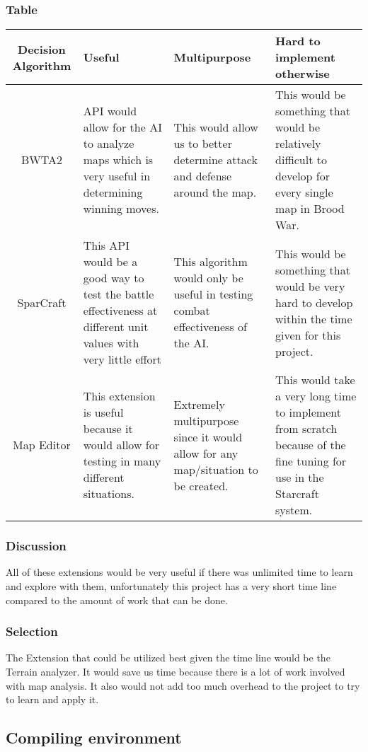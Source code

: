\documentclass[10pt,letterpaper,onecolumn,draftclsnofoot]{IEEEtran}
\begin{document}
\subsubsection{Table}
\begin{center}
	\begin{tabular}{ ||C|M|M|M|| } 
		\hline
		Decision Algorithm & Useful & Multipurpose & Hard to implement otherwise \\
		\hline
		BWTA2 & API would allow for the AI to analyze maps which is very useful in determining winning moves. & This would allow us to better determine attack and defense around the map. & This would be something that would be relatively difficult to develop for every single map in Brood War. \\ 
		\hline
		SparCraft & This API would be a good way to test the battle effectiveness at different unit values with very little effort & This algorithm would only be useful in testing combat effectiveness of the AI. & This would be something that would be very hard to develop within the time given for this project. \\ 
		\hline
		Map Editor & This extension is useful because it would allow for testing in many different situations. & Extremely multipurpose since it would allow for any map/situation to be created. & This would take a very long time to implement from scratch because of the fine tuning for use in the Starcraft system. \\ 
		\hline
	\end{tabular}
\end{center}
\subsubsection{Discussion}
All of these extensions would be very useful if there was unlimited time to learn and explore with them, unfortunately this project has a very short time line compared to the amount of work that can be done. 
\subsubsection{Selection}
The Extension that could be utilized best given the time line would be the Terrain analyzer. It would save us time because there is a lot of work involved with map analysis. It also would not add too much overhead to the project to try to learn and apply it.

\subsection{Compiling environment}
\end{document}
